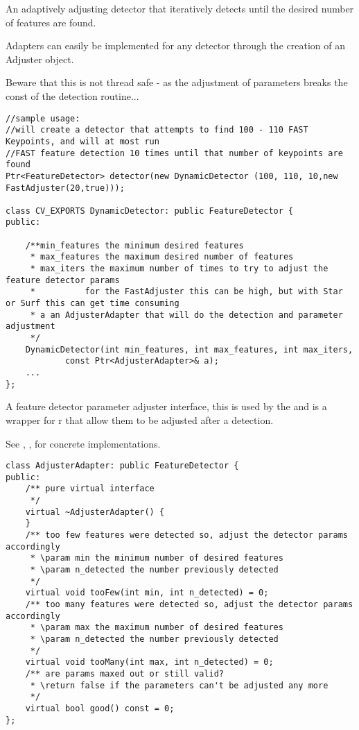 An adaptively adjusting detector that iteratively detects until the desired number
of features are found.

Adapters can easily be implemented for any detector through the creation of an Adjuster
object.

Beware that this is not thread safe - as the adjustment of parameters breaks the const
of the detection routine...

\begin{lstlisting}
//sample usage:
//will create a detector that attempts to find 100 - 110 FAST Keypoints, and will at most run
//FAST feature detection 10 times until that number of keypoints are found
Ptr<FeatureDetector> detector(new DynamicDetector (100, 110, 10,new FastAdjuster(20,true)));
 
class CV_EXPORTS DynamicDetector: public FeatureDetector {
public:

	/**min_features the minimum desired features
	 * max_features the maximum desired number of features
	 * max_iters the maximum number of times to try to adjust the feature detector params
	 * 			for the FastAdjuster this can be high, but with Star or Surf this can get time consuming
	 * a an AdjusterAdapter that will do the detection and parameter adjustment
	 */
	DynamicDetector(int min_features, int max_features, int max_iters,
			const Ptr<AdjusterAdapter>& a);
 	...
};
 \end{lstlisting}
A feature detector parameter adjuster interface, this is used by the 
and is a wrapper for  r that allow them to be adjusted after a detection.

See  , ,  for concrete implementations.
\begin{lstlisting}
class AdjusterAdapter: public FeatureDetector {
public:
	/** pure virtual interface
	 */
	virtual ~AdjusterAdapter() {
	}
	/** too few features were detected so, adjust the detector params accordingly
	 * \param min the minimum number of desired features
	 * \param n_detected the number previously detected
	 */
	virtual void tooFew(int min, int n_detected) = 0;
	/** too many features were detected so, adjust the detector params accordingly
	 * \param max the maximum number of desired features
	 * \param n_detected the number previously detected
	 */
	virtual void tooMany(int max, int n_detected) = 0;
	/** are params maxed out or still valid?
	 * \return false if the parameters can't be adjusted any more
	 */
	virtual bool good() const = 0;
};
\end{lstlisting}
 
